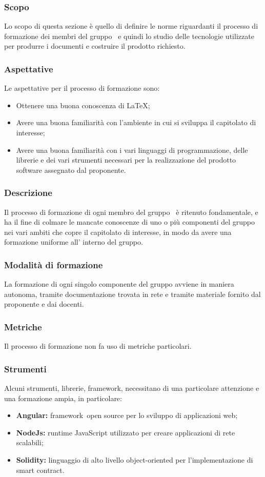         \subsubsection {Scopo}
        Lo scopo di questa sezione è quello di definire le norme riguardanti il processo di formazione dei membri del gruppo \groupName\ e quindi lo studio delle tecnologie utilizzate per produrre i documenti e costruire il prodotto richiesto.
        \subsubsection {Aspettative}
        Le aspettative per il processo di formazione sono:
        \begin {itemize}
          \item Ottenere una buona conoscenza di \LaTeX;
          \item Avere una buona familiarità con l'ambiente in cui si sviluppa il capitolato di interesse;
          \item Avere una buona familiarità con i vari linguaggi di programmazione, delle librerie e dei vari strumenti necessari per la realizzazione del prodotto software assegnato dal proponente.
        \end {itemize}
        \subsubsection {Descrizione}
        Il processo di formazione di ogni membro del gruppo \groupName\ è ritenuto fondamentale, e ha il fine di colmare le mancate conoscenze di uno o più componenti del gruppo nei vari ambiti che copre il capitolato di interesse, in modo da avere una formazione uniforme all' interno del gruppo.
        \subsubsection {Modalità di formazione}
        La formazione di ogni singolo componente del gruppo avviene in maniera autonoma, tramite documentazione trovata in rete e tramite materiale fornito dal proponente e dai docenti.
        \subsubsection {Metriche}
        Il processo di formazione non fa uso di metriche particolari.
        \subsubsection {Strumenti}
        Alcuni strumenti, librerie, framework\glo, necessitano di una particolare attenzione e una formazione ampia, in particolare:
        \begin {itemize}
          \item \textbf{Angular:} framework\glo\ open source per lo sviluppo di applicazioni web;
          \item \textbf{NodeJs: } runtime JavaScript utilizzato per creare applicazioni di rete scalabili;
          \item \textbf{Solidity: } linguaggio di alto livello object-oriented per l'implementazione di smart contract\glo.
        \end {itemize}